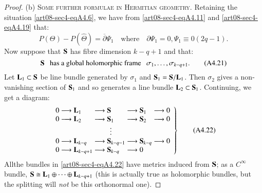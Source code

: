 \begin{proof}
(b) \textsc{Some further formulae in Hermitian geometry.} Retaining the situation \eqref{art08-sec4-eqA4.6}, we have from \eqref{art08-sec4-eqA4.11} and \eqref{art08-sec4-eqA4.19} that:
\begin{equation*}
P(\Theta)-P(\widehat{\Theta})=\overline{\partial}\Psi_{1}\text{~~ where~~ } \partial\Psi_{1}=0,\Psi_{1}\equiv 0(2q-1).\tag{A4.20}\label{art08-sec4-eqA4.20}
\end{equation*}
Now suppose that $\mathbf{S}$ has fibre dimension $k-q+1$ and that:
\begin{equation*}
\mathbf{S}\text{~~ has a global holomorphic frame~~ } \sigma_{1},\ldots,\sigma_{k-q+1}.\tag{A4.21} \label{art08-sec4-eqA4.21}
\end{equation*}
Let $\mathbf{L}_{1}\subset \mathbf{S}$ be line bundle generated by $\sigma_{1}$ and $\mathbf{S}_{1}=\mathbf{S}/\mathbf{L}_{1}$. Then $\sigma_{2}$ gives a non-vanishing section of $\mathbf{S}_{1}$ and so generates a line bundle $\mathbf{L}_{2}\subset \mathbf{S}_{1}$. Continuing, we get a diagram:
\begin{equation*}
\left.
\begin{array}{l@{\;}l@{\;}l@{\;}l}
0\longrightarrow \bfL_{1} & \longrightarrow \bfS & \longrightarrow \bfS_{1} & \longrightarrow 0\\
0\longrightarrow \bfL_{2} & \longrightarrow \bfS_{1} & \longrightarrow \bfS_{2} & \longrightarrow 0\\
 & \multicolumn{1}{c}{$\vdots$} & & \\
0\longrightarrow \bfL_{k-q} & \longrightarrow \bfS_{k-q-1} & \longrightarrow \bfS_{k-q} & \longrightarrow 0\\
0\longrightarrow \bfL_{k-q+1} & \longrightarrow \bfS_{k-q} & \longrightarrow 0 &
\end{array}
\right\}\tag{A4.22}\label{art08-sec4-eqA4.22}
\end{equation*}
All\pageoriginale the bundles in \eqref{art08-sec4-eqA4.22} have metrics induced from $\mathbf{S}$; as a $C^{\infty}$ bundle, $\mathbf{S}\cong \mathbf{L}_{1}\oplus\cdots\oplus \mathbf{L}_{k-q+1}$ (this is actually true as holomorphic bundles, but the splitting will {\em not} be this orthonormal one).


\end{proof}
